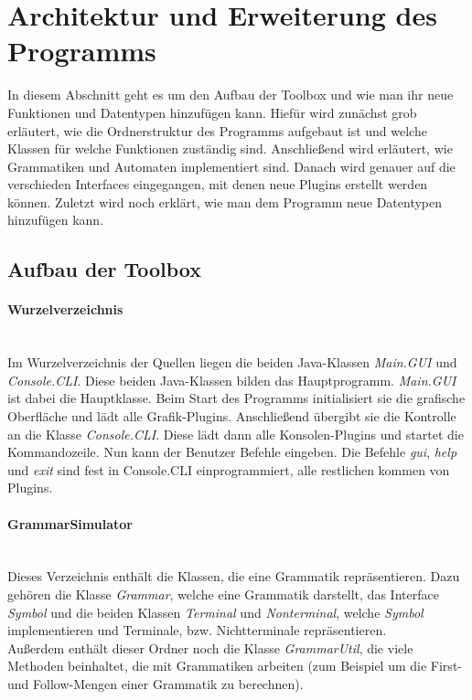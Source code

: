 \section{Architektur und Erweiterung des Programms}\raggedbottom
\label{sec:3}
In diesem Abschnitt geht es um den Aufbau der Toolbox und wie man ihr neue Funktionen und Datentypen hinzufügen kann. Hiefür wird zunächst grob erläutert, wie die Ordnerstruktur des Programms aufgebaut ist und welche Klassen für welche Funktionen zuständig sind. Anschließend wird erläutert, wie Grammatiken und Automaten implementiert sind. Danach wird genauer auf die verschieden Interfaces eingegangen, mit denen neue Plugins erstellt werden können. Zuletzt wird noch erklärt, wie man dem Programm neue Datentypen hinzufügen kann.
\subsection{Aufbau der Toolbox}
\label{sec:3.1}
\paragraph{Wurzelverzeichnis}\ \\
Im Wurzelverzeichnis der Quellen liegen die beiden Java-Klassen \textit{Main.GUI} und \textit{Console.CLI}. Diese beiden Java-Klassen bilden das Hauptprogramm. \textit{Main.GUI} ist dabei die Hauptklasse. Beim Start des Programms initialisiert sie die grafische Oberfläche und lädt alle Grafik-Plugins. Anschließend übergibt sie die Kontrolle an die Klasse \textit{Console.CLI}. Diese lädt dann alle Konsolen-Plugins und startet die Kommandozeile. Nun kann der Benutzer Befehle eingeben. Die Befehle \textit{gui}, \textit{help} und \textit{exit} sind fest in Console.CLI einprogrammiert, alle restlichen kommen von Plugins.
\paragraph{GrammarSimulator}\ \\
Dieses Verzeichnis enthält die Klassen, die eine Grammatik repräsentieren. Dazu gehören die Klasse \textit{Grammar}, welche eine Grammatik darstellt, das Interface \textit{Symbol} und die beiden Klassen \textit{Terminal} und \textit{Nonterminal}, welche \textit{Symbol} implementieren und Terminale, bzw. Nichtterminale repräsentieren.\\
Außerdem enthält dieser Ordner noch die Klasse \textit{GrammarUtil}, die viele Methoden beinhaltet, die mit Grammatiken arbeiten (zum Beispiel um die First- und Follow-Mengen einer Grammatik zu berechnen).

